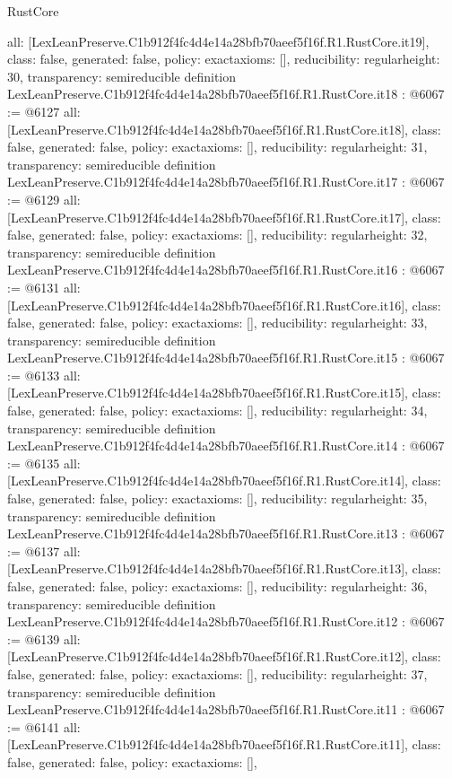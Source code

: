 \begin{lexlean}{RustCore}
\begin{coremodule}
{  all: [LexLeanPreserve.C1b912f4fc4d4e14a28bfb70aeef5f16f.R1.RustCore.it19],
  class: false,
  generated: false,
  policy: exact{axioms: []},
  reducibility: regular{height: 30},
  transparency: semireducible
}
definition LexLeanPreserve.C1b912f4fc4d4e14a28bfb70aeef5f16f.R1.RustCore.it18 : @6067 := @6127 {
  all: [LexLeanPreserve.C1b912f4fc4d4e14a28bfb70aeef5f16f.R1.RustCore.it18],
  class: false,
  generated: false,
  policy: exact{axioms: []},
  reducibility: regular{height: 31},
  transparency: semireducible
}
definition LexLeanPreserve.C1b912f4fc4d4e14a28bfb70aeef5f16f.R1.RustCore.it17 : @6067 := @6129 {
  all: [LexLeanPreserve.C1b912f4fc4d4e14a28bfb70aeef5f16f.R1.RustCore.it17],
  class: false,
  generated: false,
  policy: exact{axioms: []},
  reducibility: regular{height: 32},
  transparency: semireducible
}
definition LexLeanPreserve.C1b912f4fc4d4e14a28bfb70aeef5f16f.R1.RustCore.it16 : @6067 := @6131 {
  all: [LexLeanPreserve.C1b912f4fc4d4e14a28bfb70aeef5f16f.R1.RustCore.it16],
  class: false,
  generated: false,
  policy: exact{axioms: []},
  reducibility: regular{height: 33},
  transparency: semireducible
}
definition LexLeanPreserve.C1b912f4fc4d4e14a28bfb70aeef5f16f.R1.RustCore.it15 : @6067 := @6133 {
  all: [LexLeanPreserve.C1b912f4fc4d4e14a28bfb70aeef5f16f.R1.RustCore.it15],
  class: false,
  generated: false,
  policy: exact{axioms: []},
  reducibility: regular{height: 34},
  transparency: semireducible
}
definition LexLeanPreserve.C1b912f4fc4d4e14a28bfb70aeef5f16f.R1.RustCore.it14 : @6067 := @6135 {
  all: [LexLeanPreserve.C1b912f4fc4d4e14a28bfb70aeef5f16f.R1.RustCore.it14],
  class: false,
  generated: false,
  policy: exact{axioms: []},
  reducibility: regular{height: 35},
  transparency: semireducible
}
definition LexLeanPreserve.C1b912f4fc4d4e14a28bfb70aeef5f16f.R1.RustCore.it13 : @6067 := @6137 {
  all: [LexLeanPreserve.C1b912f4fc4d4e14a28bfb70aeef5f16f.R1.RustCore.it13],
  class: false,
  generated: false,
  policy: exact{axioms: []},
  reducibility: regular{height: 36},
  transparency: semireducible
}
definition LexLeanPreserve.C1b912f4fc4d4e14a28bfb70aeef5f16f.R1.RustCore.it12 : @6067 := @6139 {
  all: [LexLeanPreserve.C1b912f4fc4d4e14a28bfb70aeef5f16f.R1.RustCore.it12],
  class: false,
  generated: false,
  policy: exact{axioms: []},
  reducibility: regular{height: 37},
  transparency: semireducible
}
definition LexLeanPreserve.C1b912f4fc4d4e14a28bfb70aeef5f16f.R1.RustCore.it11 : @6067 := @6141 {
  all: [LexLeanPreserve.C1b912f4fc4d4e14a28bfb70aeef5f16f.R1.RustCore.it11],
  class: false,
  generated: false,
  policy: exact{axioms: []},
}
\end{coremodule}
\end{lexlean}
